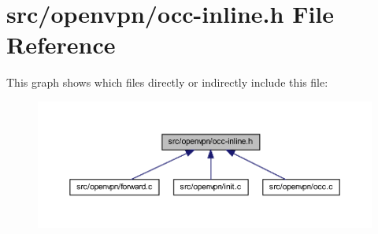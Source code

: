 \hypertarget{occ-inline_8h}{}\section{src/openvpn/occ-\/inline.h File Reference}
\label{occ-inline_8h}
This graph shows which files directly or indirectly include this file\+:
\nopagebreak
\begin{figure}[H]
\begin{center}
\leavevmode
\includegraphics[width=350pt]{occ-inline_8h__dep__incl}
\end{center}
\end{figure}
